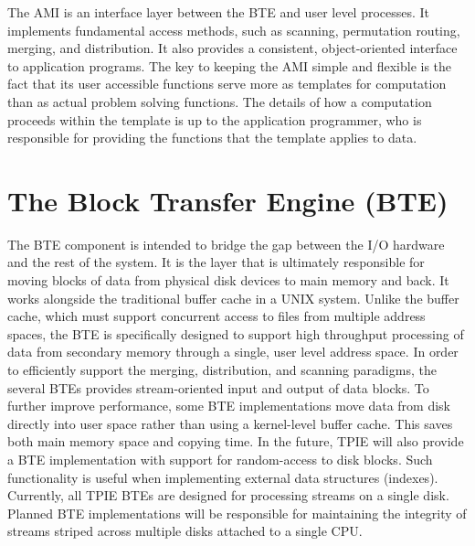 
The AMI is an interface layer between the BTE and user
level processes.  It implements fundamental access methods, such as
scanning, permutation routing, merging, and distribution. It also provides
a consistent, object-oriented interface to application programs.
The key to keeping the AMI simple and flexible is the fact that its
user accessible functions serve more as templates for computation than
as actual problem solving functions.  The details of how a computation
proceeds within the template is up to the application programmer, who
is responsible for providing the functions that the template applies
to data.

\section{The Block Transfer Engine (BTE)}
\label{sec:ref-bte}

\tobeextended 

The BTE component is intended to bridge the gap between the
I/O hardware and the rest of the system. It is the layer
that is ultimately responsible for moving blocks of data
from physical disk devices to main memory and back. It works
alongside the traditional buffer cache
in a UNIX system.  Unlike the buffer cache, which must
support concurrent access to files from multiple address
spaces, the BTE is specifically designed to support high
throughput processing of data from secondary memory through
a single, user level address space.  In order to efficiently
support the merging, distribution, and scanning paradigms,
the several BTEs provides stream-oriented input and output
of data blocks.  To further improve performance, some BTE
implementations move data from disk directly into user space
rather than using a kernel-level buffer cache.  This saves both main memory space and copying
time. In the future, TPIE will also provide a BTE
implementation with support for random-access to disk
blocks. Such functionality is useful when implementing
external data structures (indexes).  Currently, all TPIE
BTEs are designed for processing streams on a single disk.
Planned BTE implementations will be responsible for
maintaining the integrity of streams striped across multiple
disks attached to a single CPU.

